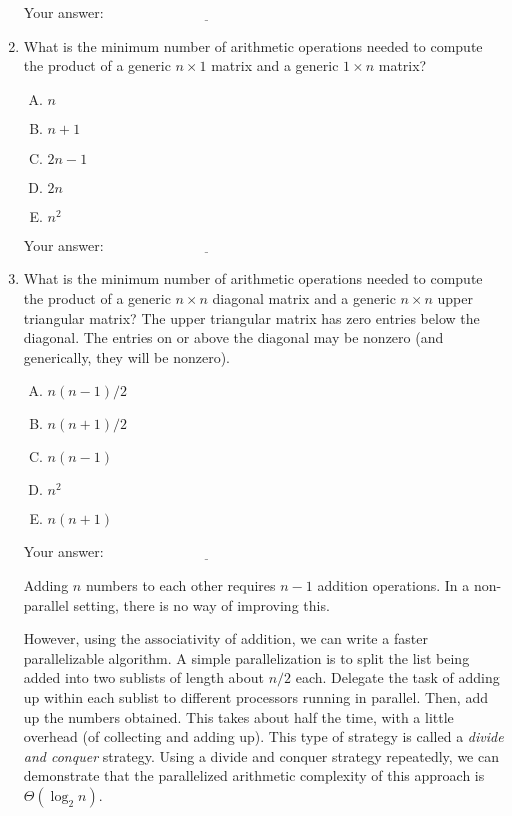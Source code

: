 \documentclass[10pt]{amsart}
\begin{document}
\begin{enumerate}
  \vspace{0.1in}
  Your answer: $\underline{\qquad\qquad\qquad\qquad\qquad\qquad\qquad}$
  \vspace{0.1in}

\item What is the minimum number of arithmetic operations needed to
  compute the product of a generic $n \times 1$ matrix and a generic
  $1 \times n$ matrix?

  \begin{enumerate}[(A)]
  \item $n$
  \item $n + 1$
  \item $2n - 1$
  \item $2n$
  \item $n^2$
  \end{enumerate}

  \vspace{0.1in}
  Your answer: $\underline{\qquad\qquad\qquad\qquad\qquad\qquad\qquad}$
  \vspace{0.1in}


\item What is the minimum number of arithmetic operations needed to
  compute the product of a generic $n \times n$ diagonal matrix and a
  generic $n \times n$ upper triangular matrix?  The upper triangular
  matrix has zero entries below the diagonal. The entries on or above
  the diagonal may be nonzero (and generically, they will be nonzero).

  \begin{enumerate}[(A)]
  \item $n(n - 1)/2$
  \item $n(n + 1)/2$
  \item $n(n - 1)$
  \item $n^2$
  \item $n(n + 1)$
  \end{enumerate}

  \vspace{0.1in}
  Your answer: $\underline{\qquad\qquad\qquad\qquad\qquad\qquad\qquad}$
  \vspace{0.1in}

  Adding $n$ numbers to each other requires $n - 1$ addition
  operations. In a non-parallel setting, there is no way of improving
  this.

  However, using the associativity of addition, we can write a faster
  parallelizable algorithm. A simple parallelization is to split the
  list being added into two sublists of length about $n/2$
  each. Delegate the task of adding up within each sublist to
  different processors running in parallel. Then, add up the numbers
  obtained. This takes about half the time, with a little overhead (of
  collecting and adding up). This type of strategy is called a {\em
    divide and conquer} strategy. Using a divide and conquer strategy
  repeatedly, we can demonstrate that the parallelized arithmetic
  complexity of this approach is $\Theta(\log_2n)$.


\end{enumerate}
\end{document}
